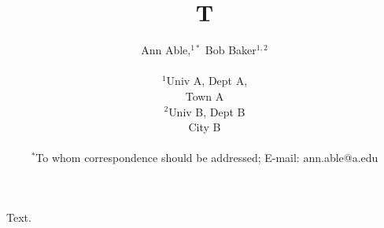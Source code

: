 \documentclass{article}
\title{T}
\author{Ann Able,$^{1\ast}$ Bob Baker$^{1,2}$\\
\\
\normalsize{$^1$Univ A, Dept A,}\\
\normalsize{Town A}\\
\normalsize{$^{2}$Univ B, Dept B}\\
\normalsize{City B}\\
\\
\normalsize{$^\ast$To whom correspondence should be addressed; E-mail: ann.able@a.edu}}
\date{}
\begin{document}
\maketitle
Text.
\end{document}
